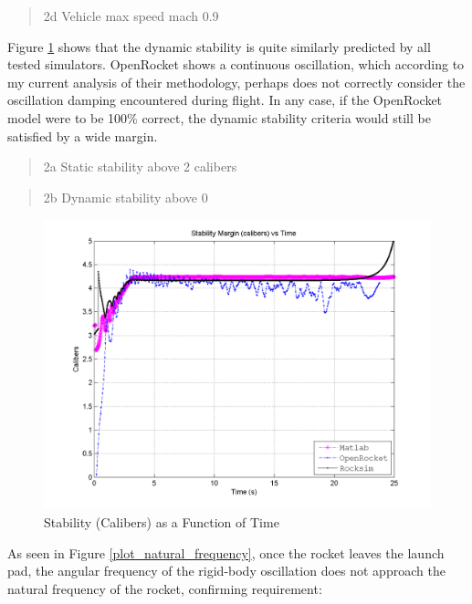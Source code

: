 \documentclass[]{article}
\begin{document}
\begin{quote}
2d Vehicle max speed mach 0.9
\end{quote}

\clearpage

Figure \ref{error_stability_calibers_plot_label} shows that the dynamic
stability is quite similarly predicted by all tested simulators.
OpenRocket shows a continuous oscillation, which according to my current
analysis of their methodology, perhaps does not correctly consider the
oscillation damping encountered during flight. In any case, if the
OpenRocket model were to be 100\% correct, the dynamic stability
criteria would still be satisfied by a wide margin.

\begin{quote}
2a Static stability above 2 calibers
\end{quote}

\begin{quote}
2b Dynamic stability above 0
\end{quote}

\begin{figure}[htbp]
\centering
\includegraphics{images/plots/error_stability_calibers_plot.png}
\caption{Stability (Calibers) as a Function of Time
\label{error_stability_calibers_plot_label}}
\end{figure}

\clearpage
As seen in Figure \ref{plot_natural_frequency}, once the rocket leaves
the launch pad, the angular frequency of the rigid-body oscillation does
not approach the natural frequency of the rocket, confirming
requirement:
\end{document}
